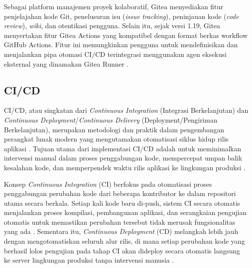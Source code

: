 \documentclass[a4paper,oneside,11pt]{book}
\begin{document}
\par Sebagai platform manajemen proyek kolaboratif, Gitea menyediakan fitur penjelajahan kode Git, penelusuran isu (\textit{issue tracking}), peninjauan kode (\textit{code review}), \textit{wiki}, dan otentikasi pengguna. Selain itu, sejak versi 1.19, Gitea menyertakan fitur Gitea Actions yang kompatibel dengan format berkas workflow GitHub Actions. Fitur ini memungkinkan pengguna untuk mendefinisikan dan menjalankan pipa otomasi CI/CD terintegrasi menggunakan agen eksekusi eksternal yang dinamakan Gitea Runner \cite{gitea-docs}.

\subsection{CI/CD}

\par CI/CD, atau singkatan dari \textit{Continuous Integration} (Integrasi Berkelanjutan) dan \textit{Continuous Deployment}/\textit{Continuous Delivery} (Deployment/Pengiriman Berkelanjutan), merupakan metodologi dan praktik dalam pengembangan perangkat lunak modern yang mengutamakan otomatisasi siklus hidup rilis aplikasi \cite{redhat-cicd}. Tujuan utama dari implementasi CI/CD adalah untuk meminimalkan intervensi manual dalam proses penggabungan kode, mempercepat umpan balik kesalahan kode, dan memperpendek waktu rilis aplikasi ke lingkungan produksi \cite{fowler-ci,redhat-cicd}.

\par Konsep \textit{Continuous Integration} (CI) berfokus pada otomatisasi proses penggabungan perubahan kode dari beberapa kontributor ke dalam repositori utama secara berkala. Setiap kali kode baru di-push, sistem CI secara otomatis menjalankan proses kompilasi, pembangunan aplikasi, dan serangkaian pengujian otomatis untuk memastikan perubahan tersebut tidak merusak fungsionalitas yang ada \cite{fowler-ci}. Sementara itu, \textit{Continuous Deployment} (CD) melangkah lebih jauh dengan mengotomatiskan seluruh alur rilis, di mana setiap perubahan kode yang berhasil lolos pengujian pada tahap CI akan dideploy secara otomatis langsung ke server lingkungan produksi tanpa intervensi manusia \cite{redhat-cicd}.


\end{document}
